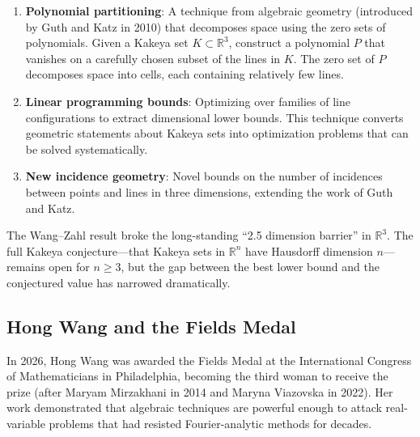 \begin{enumerate}
\item \textbf{Polynomial partitioning}: A technique from algebraic geometry (introduced by Guth and Katz in 2010) that decomposes space using the zero sets of polynomials. Given a Kakeya set $K \subset \mathbb{R}^3$, construct a polynomial $P$ that vanishes on a carefully chosen subset of the lines in $K$. The zero set of $P$ decomposes space into cells, each containing relatively few lines.
\item \textbf{Linear programming bounds}: Optimizing over families of line configurations to extract dimensional lower bounds. This technique converts geometric statements about Kakeya sets into optimization problems that can be solved systematically.
\item \textbf{New incidence geometry}: Novel bounds on the number of incidences between points and lines in three dimensions, extending the work of Guth and Katz.
\end{enumerate}

\begin{highlightbox}
The Wang--Zahl result broke the long-standing ``2.5 dimension barrier'' in $\mathbb{R}^3$. The full Kakeya conjecture---that Kakeya sets in $\mathbb{R}^n$ have Hausdorff dimension $n$---remains open for $n \geq 3$, but the gap between the best lower bound and the conjectured value has narrowed dramatically.
\end{highlightbox}

\subsection{Hong Wang and the Fields Medal}

In 2026, Hong Wang was awarded the Fields Medal at the International Congress of Mathematicians in Philadelphia, becoming the third woman to receive the prize (after Maryam Mirzakhani in 2014 and Maryna Viazovska in 2022). Her work demonstrated that algebraic techniques are powerful enough to attack real-variable problems that had resisted Fourier-analytic methods for decades.

